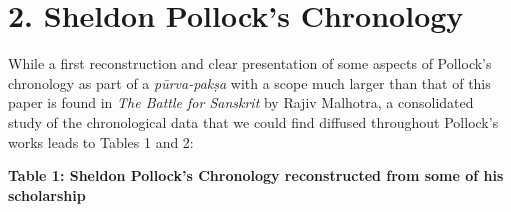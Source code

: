 \bigskip

\section*{2. Sheldon Pollock’s Chronology}

\smallskip
\smallskip

While a first reconstruction and clear presentation of some aspects of Pollock’s chronology as part of a \textit{pūrva-pakṣa} with a scope much larger than that of this paper is found in \textit{The Battle for Sanskrit} by Rajiv Malhotra, a consolidated study of the chronological data that we could find diffused throughout Pollock’s works leads to Tables 1 and 2:

\newpage

\textbf{Table 1: Sheldon Pollock’s Chronology reconstructed from some of his scholarship}

